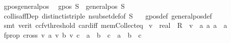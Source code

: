 \begin{isabellebody}
\isanewline
{}\isamarkupfalse%
\ gpos{\isacharunderscore}{\kern0pt}generalpos{\isacharcolon}{\kern0pt}\isanewline
\ \ {\isachardoublequoteopen}gpos\ S\ {\isasymlongleftrightarrow}\ general{\isacharunderscore}{\kern0pt}pos\ S{\isachardoublequoteclose}\ \isanewline
%
\isadelimproof
\ \ %
\endisadelimproof
%
\isatagproof
{}\isamarkupfalse%
\ coll{\isacharunderscore}{\kern0pt}is{\isacharunderscore}{\kern0pt}affDep\ distinct{\isacharunderscore}{\kern0pt}is{\isacharunderscore}{\kern0pt}triple\ nsubset{\isacharunderscore}{\kern0pt}def{\isacharbrackleft}{\kern0pt}of\ {\isachardoublequoteopen}S{\isachardoublequoteclose}\ {\isachardoublequoteopen}{}{\isachardoublequoteclose}{\isacharbrackright}{\kern0pt}\ \isamarkupfalse%
\ gpos{\isacharunderscore}{\kern0pt}def\ general{\isacharunderscore}{\kern0pt}pos{\isacharunderscore}{\kern0pt}def\isanewline
\ \ \isamarkupfalse%
\ {\isacharparenleft}{\kern0pt}smt\ {\isacharparenleft}{\kern0pt}verit{\isacharcomma}{\kern0pt}\ ccfv{\isacharunderscore}{\kern0pt}threshold{\isacharparenright}{\kern0pt}\ card{\isacharunderscore}{\kern0pt}{}{\isacharunderscore}{\kern0pt}iff\ mem{\isacharunderscore}{\kern0pt}Collect{\isacharunderscore}{\kern0pt}eq{\isacharparenright}{\kern0pt}%
\endisatagproof
{\isafoldproof}%
%
\isadelimproof
\isanewline
%
\endisadelimproof
\isanewline
{}\isamarkupfalse%
\ v{}\ {\isacharcolon}{\kern0pt}{\isacharcolon}{\kern0pt}\ {\isachardoublequoteopen}real\ {\isasymRightarrow}\ R{}{\isachardoublequoteclose}\ \ {\isachardoublequoteopen}v{}\ {\isasymequiv}\ {\isasymlambda}a{\isachardot}{\kern0pt}\ {\isacharparenleft}{\kern0pt}a{\isacharcomma}{\kern0pt}\ a\ {\isacharasterisk}{\kern0pt}\ a{\isacharparenright}{\kern0pt}{\isachardoublequoteclose}\isanewline
{}\isamarkupfalse%
\ f{\isacharunderscore}{\kern0pt}prop{}{\isacharcolon}{\kern0pt}\ {\isachardoublequoteopen}cross{}\ {\isacharparenleft}{\kern0pt}v{}\ a{\isacharparenright}{\kern0pt}\ {\isacharparenleft}{\kern0pt}v{}\ b{\isacharparenright}{\kern0pt}\ {\isacharparenleft}{\kern0pt}v{}\ c{\isacharparenright}{\kern0pt}\ {\isacharequal}{\kern0pt}\ {\isacharparenleft}{\kern0pt}a\ {\isacharminus}{\kern0pt}\ b{\isacharparenright}{\kern0pt}\ {\isacharasterisk}{\kern0pt}\ {\isacharparenleft}{\kern0pt}c\ {\isacharminus}{\kern0pt}\ a{\isacharparenright}{\kern0pt}\ {\isacharasterisk}{\kern0pt}\ {\isacharparenleft}{\kern0pt}b\ {\isacharminus}{\kern0pt}\ c{\isacharparenright}{\kern0pt}{\isachardoublequoteclose}\ \isanewline

\end{isabellebody}
